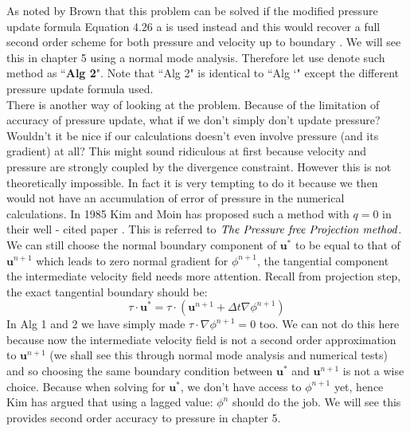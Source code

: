 As noted by Brown that this problem can be solved if the modified pressure update formula Equation 4.26 a is used instead and this would recover a full second order scheme for both pressure and velocity up to boundary \cite{brown2001accurate}. We will see this in chapter 5 using a normal mode analysis. Therefore let use denote such method as ``\textbf{Alg 2}". Note that ``Alg 2" is identical to ``Alg `" except the different pressure update formula used.\\

There is another way of looking at the problem. Because of the limitation of accuracy of pressure update, what if we don't simply don't update pressure? Wouldn't it be nice if our calculations doesn't even involve pressure (and its gradient) at all? This might sound ridiculous at first because velocity and pressure are strongly coupled by the divergence constraint. However this is not theoretically impossible. In fact it is very tempting to do it because we then would not have an accumulation of error of pressure in the numerical calculations. In 1985 Kim and Moin has proposed such a method with $\textit{q}=0$ in their well - cited paper \cite{kim1985application}. This is referred to $\emph{The Pressure free Projection method}$.\\

We can still choose the normal boundary component of $\textbf{u}^*$ to be equal to that of $\textbf{u}^{n+1}$ which leads to zero normal gradient for $\phi^{n+1}$, the tangential component the intermediate velocity field needs more attention. Recall from projection step, the exact tangential boundary should be:
\begin{equation}
\textbf{$\tau$}\cdot\textbf{u}^* = \textbf{$\tau$}\cdot\left(\textbf{u}^{n+1} + \Delta t \nabla \phi^{n+1}\right)
\end{equation}
In Alg 1 and 2 we have simply made $\textbf{$\tau$}\cdot\nabla\phi^{n+1} = 0$ too. We can not do this here because now the intermediate velocity field is not a second order approximation to $\textbf{u}^{n+1}$ (we shall see this through normal mode analysis and numerical tests) and so choosing the same boundary condition between $\textbf{u}^*$ and $\textbf{u}^{n+1}$ is not a wise choice. Because when solving for $\textbf{u}^*$, we don't have access to $\phi^{n+1}$ yet, hence Kim has argued that using a lagged value: $\phi^n$ should do the job. We will see this provides second order accuracy to pressure in chapter 5.\\

